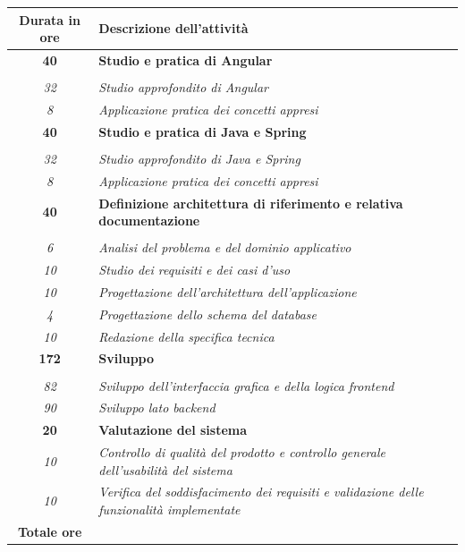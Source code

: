 

\begin{tabularx}{\textwidth}{|c|X|}
	\hline
	\textbf{Durata in ore} & \textbf{Descrizione dell'attività} \\\hline
	
	\textbf{40} & \textbf{Studio e pratica di Angular} \\ \hdashline 
    \multirow{4}{0cm}\\ 
    \textit{32} & 
    \textit{Studio approfondito di Angular} \\
    \textit{8} & 
    \textit{Applicazione pratica dei concetti appresi} \\
    \hline
    \textbf{40} & \textbf{Studio e pratica di Java e Spring} \\ \hdashline 
    \multirow{4}{0cm}\\ 
    \textit{32} & 
    \textit{Studio approfondito di Java e Spring} \\
    \textit{8} & 
    \textit{Applicazione pratica dei concetti appresi} \\
    \hline

    \textbf{40} & \textbf{Definizione architettura di riferimento e relativa documentazione} \\ \hdashline 
    \multirow{3}{0cm}\\ 
    \textit{6} & 
    \textit{Analisi del problema e del dominio applicativo} \\
    \textit{10} & 
    \textit{Studio dei requisiti e dei casi d'uso} \\
    \textit{10} & 
    \textit{Progettazione dell'architettura dell'applicazione} \\
    \textit{4} & 
    \textit{Progettazione dello schema del database} \\
    \textit{10} & 
    \textit{Redazione della specifica tecnica} \\
    \hline
    
    \textbf{172} & \textbf{Sviluppo}  \\ \hdashline 
    \multirow{4}{0cm}\\ 
    \textit{82} & 
    \textit{Sviluppo dell'interfaccia grafica e della logica frontend} \\
    \textit{90} & 
    \textit{Sviluppo lato backend} \\
    \hline

    \textbf{20} & \textbf{Valutazione del sistema} \\ \hdashline 
    \textit{10} & \textit{Controllo di qualità del prodotto e controllo generale dell'usabilità del sistema} \\
    \textit{10} & \textit{Verifica del soddisfacimento dei requisiti e validazione delle funzionalità implementate} \\
    \hline
	
	\textbf{Totale ore} & \multicolumn{1}{|c|}{\textbf{\totaleOre}} \\\hline
	
	
\end{tabularx}